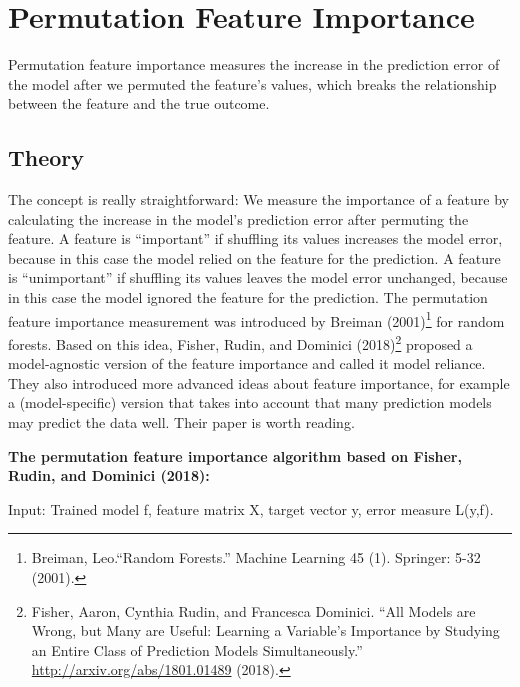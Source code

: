 \documentclass[
  12pt,
]{krantz}
\begin{document}
\hypertarget{feature-importance}{%
\section{Permutation Feature Importance}\label{feature-importance}}

Permutation feature importance measures the increase in the prediction error of the model after we permuted the feature's values, which breaks the relationship between the feature and the true outcome.

\hypertarget{theory-3}{%
\subsection{Theory}\label{theory-3}}

The concept is really straightforward:
We measure the importance of a feature by calculating the increase in the model's prediction error after permuting the feature.
A feature is ``important'' if shuffling its values increases the model error, because in this case the model relied on the feature for the prediction.
A feature is ``unimportant'' if shuffling its values leaves the model error unchanged, because in this case the model ignored the feature for the prediction.
The permutation feature importance measurement was introduced by Breiman (2001)\footnote{Breiman, Leo.``Random Forests.'' Machine Learning 45 (1). Springer: 5-32 (2001).} for random forests.
Based on this idea, Fisher, Rudin, and Dominici (2018)\footnote{Fisher, Aaron, Cynthia Rudin, and Francesca Dominici. ``All Models are Wrong, but Many are Useful: Learning a Variable's Importance by Studying an Entire Class of Prediction Models Simultaneously.'' \url{http://arxiv.org/abs/1801.01489} (2018).} proposed a model-agnostic version of the feature importance and called it model reliance.
They also introduced more advanced ideas about feature importance, for example a (model-specific) version that takes into account that many prediction models may predict the data well.
Their paper is worth reading.

\textbf{The permutation feature importance algorithm based on Fisher, Rudin, and Dominici (2018):}

Input: Trained model f, feature matrix X, target vector y, error measure L(y,f).
\end{document}
